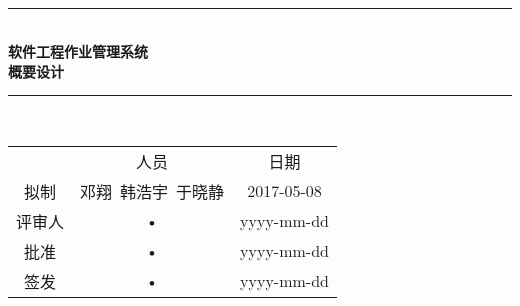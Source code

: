 \documentclass[bachelor]{ustcthesis}
\newcommand{\HRule}{\rule{\linewidth}{0.5mm}}
\begin{document}
\begin{titlepage}
\begin{center}
~\\[5cm]
\HRule \\[0.4cm]
{\huge \bfseries 软件工程作业管理系统\\概要设计}\\[0.4cm]
\HRule \\[1.5cm]

\begin{tabular}{ccc}
  & 人员 & 日期 \\
拟制 & 邓翔\ 韩浩宇\ 于晓静 & 2017-05-08 \\
评审人 & • & yyyy-mm-dd \\
批准 & • & yyyy-mm-dd \\
签发 & • & yyyy-mm-dd \\
\end{tabular}

\end{center}
\end{titlepage}



\frontmatter

\tableofcontents
\listoffigures
\listoftables
% 

\mainmatter

















\end{document}
